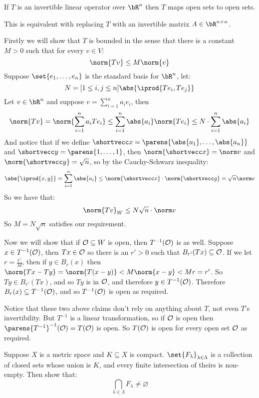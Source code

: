 \documentclass[10pt]{article}
\def\openset{{\cal O}}
\begin{document}
\begin{exercise*}

    If $T$ is an invertible linear operator over $\bR^n$ then $T$ maps open sets to open sets.

\end{exercise*}

This is equivalent with replacing $T$ with an invertible matrix $A\in\bR^{n\times n}$.

\begin{blankpp}

    Firstly we will show that $T$ is bounded in the sense that there is a constant $M>0$ such that for every $v\in V$:
    \[ \norm{Tv} \leq M\norm{v} \]
    Suppose $\set{e_1,\dots,e_n}$ is the standard basis for $\bR^n$, let:
    \[ N = \maxof[1\leq i,j\leq n]{\abs{\iprod{Te_i, Te_j}}} \]
    Let $v\in\bR^n$ and suppose $v=\sum_{i=1}^n a_ie_i$, then
    \[ \norm{Tv} = \norm{\sum_{i=1}^n a_i Te_i} \leq \sum_{i=1}^n\abs{a_i}\norm{Te_i} \leq N\cdot\sum_{i=1}^n\abs{a_i} \]
    And notice that if we define $\shortvecc x=\parens{\abs{a_1},\dots,\abs{a_n}}$ and $\shortvecc y=\parens{1,\dots,1}$, then
    $\norm{\shortvecc x}=\norm v$ and $\norm{\shortvecc y}=\sqrt n$, so by the Cauchy-Schwarz inequality:
    \[ \abs{\iprod{x,y}} = \sum_{i=1}^n \abs{a_i} \leq \norm{\shortvecc x}\cdot\norm{\shortvecc y} = \sqrt n\norm v \]
    So we have that:
    \[ \norm{Tv}_W \leq N\sqrt n\cdot\norm v \]
    So $M=N\sqrt n$ satisfies our requirement.

    Now we will show that if $\openset\subseteq W$ is open, then $T^{-1}(\openset)$ is as well.
    Suppose $x\in T^{-1}(\openset)$, then $Tx\in\openset$ so there is an $r'>0$ such that $B_{r'}(Tx)\subseteq\openset$.
    If we let $r=\frac{r'}M$, then if $y\in B_r(x)$ then $\norm{Tx-Ty}=\norm{T(x-y)}<M\norm{x-y}<Mr=r'$.
    So $Ty\in B_{r'}(Tx)$, and so $Ty$ is in $\openset$, and therefore $y\in T^{-1}(\openset)$.
    Therefore $B_r(x)\subseteq T^{-1}(\openset)$, and so $T^{-1}(\openset)$ is open as required.

    Notice that these two above claims don't rely on anything about $T$, not even $T$'s invertibility.
    But $T^{-1}$ is a linear transformation, so if $\openset$ is open then $\parens{T^{-1}}^{-1}(\openset)=T(\openset)$ is open.
    So $T(\openset)$ is open for every open set $\openset$ as required.

\end{blankpp}

\begin{exercise*}

    Suppose $X$ is a metric space and $K\subseteq X$ is compact.
    $\set{F_\lambda}_{\lambda\in\Lambda}$ is a collection of closed sets whose union is $K$, and every finite intersection of theirs
    is non-empty.
    Then show that:
    \[ \bigcap_{\lambda\in\Lambda} F_\lambda \neq \varnothing \]

\end{exercise*}
\end{document}
